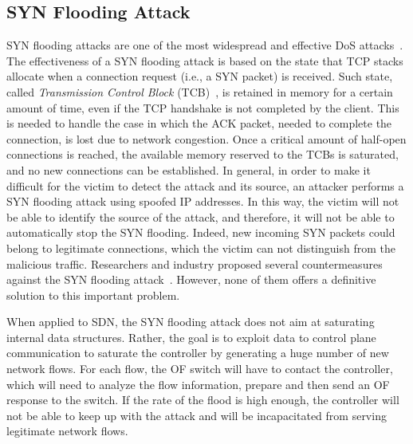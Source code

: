 \documentclass{sig-alternate}
\begin{document}
\subsection{SYN Flooding Attack}\label{sec:syn_flooding}
SYN flooding attacks are one of the most widespread and effective DoS attacks~\cite{Peng:2007:SND:1216370.1216373}. The effectiveness of a SYN flooding attack is based on the state that TCP stacks allocate when a connection request (i.e., a SYN packet) is received. 
Such state, called {\em Transmission Control Block} (TCB)~\cite{RFC793}, is retained in memory for a certain amount of time, even if the TCP handshake is not completed by the client. This is needed to handle the case in which the ACK packet, needed to complete the connection, is lost due to network congestion. 
Once a critical amount of half-open connections is reached, the available memory reserved to the TCBs is saturated, and no new connections can be established.
In general, in order to make it difficult for the victim to detect the attack and its source, an attacker performs a SYN flooding attack using spoofed IP addresses. In this way, the victim will not be able to identify the source of the attack, and therefore, it will not be able to automatically stop the SYN flooding. 
Indeed, new incoming SYN packets could belong to legitimate connections, which the victim can not distinguish from the malicious traffic.
Researchers and industry proposed several countermeasures against the SYN flooding attack~\cite{RFC4987,Peng:2007:SND:1216370.1216373}. However, none of them offers a definitive solution to this important problem. 














When applied to SDN, the SYN flooding attack does not aim at saturating internal data structures. 
Rather, the goal is to exploit data to control plane communication to saturate the controller by generating a huge number of new network flows. 
For each flow, the OF switch will have to contact the controller, which will need to analyze the flow information, prepare and then send an OF response to the switch. 
If the rate of the flood is high enough, the controller will not be able to keep up with the attack and will be incapacitated from serving legitimate network flows.
\end{document}
